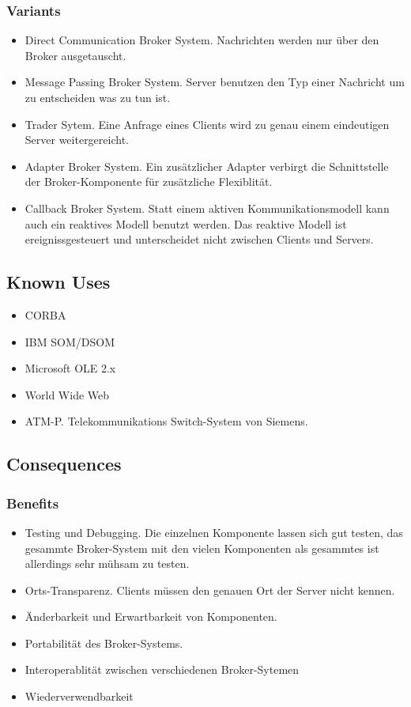 \subsubsection*{Variants}
\begin{itemize}
	\item Direct Communication Broker System. Nachrichten werden nur über den Broker ausgetauscht.
	\item Message Passing Broker System. Server benutzen den Typ einer Nachricht um zu entscheiden was zu tun ist.
	\item Trader Sytem. Eine Anfrage eines Clients wird zu genau einem eindeutigen Server weitergereicht.
	\item Adapter Broker System. Ein zusätzlicher Adapter verbirgt die Schnittstelle der Broker-Komponente für zusätzliche Flexiblität.
	\item Callback Broker System. Statt einem aktiven Kommunikationsmodell kann auch ein reaktives Modell benutzt werden. Das reaktive Modell ist ereignissgesteuert und unterscheidet nicht zwischen Clients und Servers.
\end{itemize}

\subsection*{Known Uses}


\begin{itemize}
	\item CORBA
	\item IBM SOM/DSOM
	\item Microsoft OLE 2.x
	\item World Wide Web
	\item ATM-P. Telekommunikations Switch-System von Siemens.
\end{itemize}

\subsection*{Consequences}


\subsubsection*{Benefits}


\begin{itemize}
	\item Testing und Debugging. Die einzelnen Komponente lassen sich gut testen, das gesammte Broker-System mit den vielen Komponenten als gesammtes ist allerdings sehr mühsam zu testen.
	\item Orts-Transparenz. Clients müssen den genauen Ort der Server nicht kennen.
	\item Änderbarkeit und Erwartbarkeit von Komponenten.
	\item Portabilität des Broker-Systems.
	\item Interoperablität zwischen verschiedenen Broker-Sytemen
	\item Wiederverwendbarkeit
\end{itemize}

